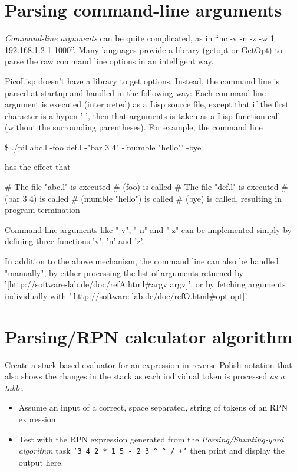 \pagebreak{}
\section*{Parsing command-line arguments}

\emph{Command-line arguments} can be quite complicated, as in ``nc -v
-n -z -w 1 192.168.1.2 1-1000''. Many languages provide a library
(getopt or GetOpt) to parse the raw command line options in an
intelligent way.

\begin{wideverbatim}

PicoLisp doesn't have a library to get options. Instead, the command line is
parsed at startup and handled in the following way: Each command line argument
is executed (interpreted) as a Lisp source file, except that if the first
character is a hypen '-', then that arguments is taken as a Lisp function call
(without the surrounding parentheses). For example, the command line

\$ ./pil abc.l -foo def.l -"bar 3 4" -'mumble "hello"' -bye

has the effect that

# The file "abc.l" is executed
# (foo) is called
# The file "def.l" is executed
# (bar 3 4) is called
# (mumble "hello") is called
# (bye) is called, resulting in program termination

Command line arguments like "-v", "-n" and "-z" can be implemented simply by
defining three functions 'v', 'n' and 'z'.

In addition to the above mechanism, the command line can also be handled
"manually", by either processing the list of arguments returned by
'[http://software-lab.de/doc/refA.html#argv argv]', or by fetching arguments
individually with '[http://software-lab.de/doc/refO.html#opt opt]'.

\end{wideverbatim}

\pagebreak{}
\section*{Parsing/RPN calculator algorithm}

Create a stack-based evaluator for an expression in
\href{http://en.wikipedia.org/wiki/Reverse\_Polish\_notation}{reverse
Polish notation} that also shows the changes in the stack as each
individual token is processed \emph{as a table}.

\begin{itemize}
\item
  Assume an input of a correct, space separated, string of tokens of an
  RPN expression
\item Test with the RPN expression generated from the
  \emph{Parsing/Shunting-yard algorithm} task \texttt{'3 4 2 * 1 5 - 2
    3 \^{} \^{} / +'} then print and display the output here.
\end{itemize}

